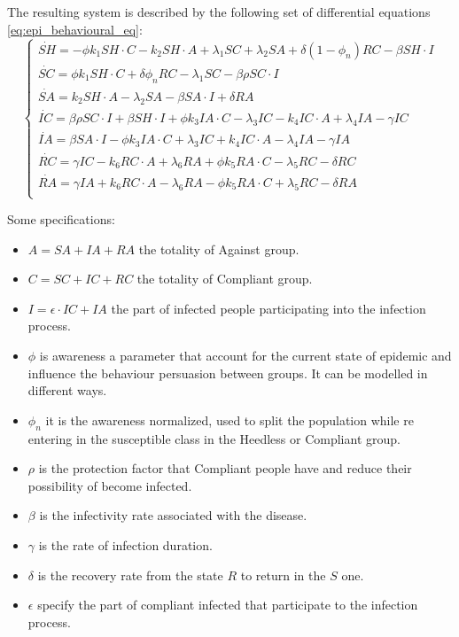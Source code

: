 The resulting system is described by the following set of differential equations \ref{eq:epi_behavioural_eq}: 
\begin{equation}
	\begin{cases}
		\dot{SH} = - \phi k_1 SH \cdot C - k_2 SH \cdot A + \lambda_1 SC + \lambda_2 SA + \delta(1-\phi_n)RC - \beta SH \cdot I\\
		\dot{SC} = \phi k_1 SH \cdot C + \delta \phi_n RC - \lambda_1 SC - \beta \rho SC \cdot I  \\
		\dot{SA} = k_2 SH \cdot A - \lambda_2 SA - \beta SA \cdot I + \delta RA \\
		\dot{IC} = \beta \rho SC \cdot I + \beta SH \cdot I + \phi k_3 IA \cdot C - \lambda_3 IC -  k_4 IC \cdot A + \lambda_4 IA - \gamma IC\\
		 \dot{IA} = \beta SA \cdot I - \phi k_3 IA \cdot C + \lambda_3 IC + k_4 IC \cdot A - \lambda_4 IA - \gamma IA\\
		 \dot{RC} = \gamma IC - k_6 RC \cdot A + \lambda_6 RA + \phi k_5 RA \cdot C - \lambda_5 RC - \delta RC\\
		 \dot{RA} = \gamma IA + k_6 RC \cdot A - \lambda_6 RA - \phi k_5 RA \cdot C + \lambda_5 RC - \delta RA\\
	\end{cases}
	\label{eq:epi_behavioural_eq}
\end{equation}

Some specifications:
\begin{itemize}
	\item $A = SA + IA + RA$ the totality of Against group.
	\item $C = SC + IC + RC$ the totality of Compliant group.
	\item $I = \epsilon \cdot IC + IA$ the part of infected people participating into the infection process.
	\item $\phi$ is awareness a parameter that account for the current state of epidemic and influence the behaviour persuasion between groups. It can be modelled in different ways. 
	\item $\phi_n$ it is the awareness normalized, used to split the population while re entering in the susceptible class in the Heedless or Compliant group. 
	\item $\rho$ is the protection factor that Compliant people have and reduce their possibility of become infected.
	\item $\beta$ is the infectivity rate associated with the disease.
	\item $\gamma$ is the rate of infection duration.
	\item $\delta$ is the recovery rate from the state $R$ to return in the $S$ one. 
	\item $\epsilon$ specify the part of compliant infected that participate to the infection process.
\end{itemize}


